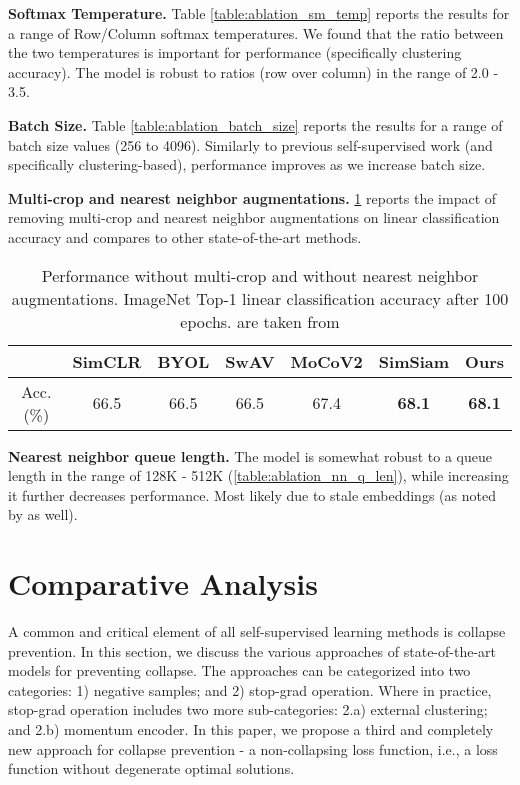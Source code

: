 \documentclass[runningheads]{llncs}
\begin{document}
\textbf{Softmax Temperature.} Table \ref{table:ablation_sm_temp} reports the results for a range of Row/Column softmax temperatures. We found that the ratio between the two temperatures is important for performance (specifically clustering accuracy). The model is robust to ratios (row over column) in the range of 2.0 - 3.5. 

\textbf{Batch Size.} Table \ref{table:ablation_batch_size} reports the results for a range of batch size values (256 to 4096). Similarly to previous self-supervised work (and specifically clustering-based), performance improves as we increase batch size.

\textbf{Multi-crop and nearest neighbor augmentations.} \cref{table:multi_crop_and_nn} reports the impact of removing multi-crop \cite{caron2020unsupervised} and nearest neighbor augmentations \cite{Dwibedi_2021_ICCV} on linear classification accuracy and compares to other state-of-the-art methods.

\begin{table}[bt]
\begin{center}
\setlength\tabcolsep{3pt}
\small
\caption{Performance without multi-crop and without nearest neighbor augmentations. ImageNet Top-1 linear classification accuracy after 100 epochs. \cite{DBLP:journals/corr/abs-2002-05709,grill2020bootstrap,caron2020unsupervised,chen2020improved} are taken from \cite{chen2021exploring}}
\label{table:multi_crop_and_nn}
\begin{tabular}{c|cccccc}
\toprule
 & SimCLR \cite{DBLP:journals/corr/abs-2002-05709} & BYOL \cite{grill2020bootstrap} & SwAV \cite{caron2020unsupervised} & MoCoV2 \cite{chen2020improved} & SimSiam \cite{chen2021exploring} & \textbf{Ours}  \\
\midrule
Acc. (\%) & 66.5 & 66.5 & 66.5 & 67.4 & \textbf{68.1} & \textbf{68.1}  \\
\bottomrule
\end{tabular}
\end{center}
\end{table}

\textbf{Nearest neighbor queue length.} The model is somewhat robust to a queue length in the range of 128K - 512K (\cref{table:ablation_nn_q_len}), while increasing it further decreases performance. Most likely due to stale embeddings (as noted by \cite{Dwibedi_2021_ICCV} as well).

\section{Comparative Analysis}
A common and critical element of all self-supervised learning methods is collapse prevention. In this section, we discuss the various approaches of state-of-the-art models for preventing collapse. The approaches can be categorized into two categories: 1) negative samples; and 2) stop-grad operation. Where in practice, stop-grad operation includes two more sub-categories: 2.a) external clustering; and 2.b) momentum encoder. In this paper, we propose a third and completely new approach for collapse prevention - a non-collapsing loss function, i.e., a loss function without degenerate optimal solutions.
\end{document}
